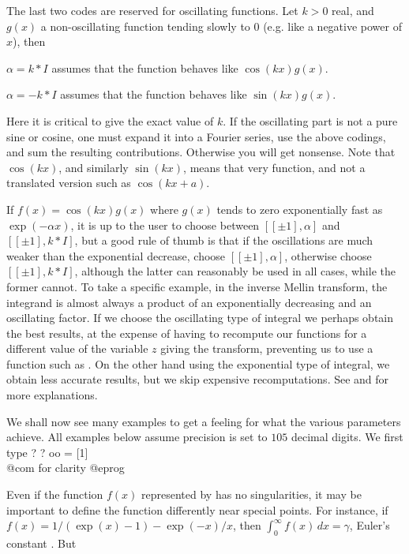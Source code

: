 \smallskip The last two codes are reserved for oscillating functions.
Let $k > 0$ real, and $g(x)$ a non-oscillating function tending slowly to $0$
(e.g. like a negative power of $x$), then

\item $\alpha=k * I$ assumes that the function behaves like $\cos(kx)g(x)$.

\item $\alpha=-k* I$ assumes that the function behaves like $\sin(kx)g(x)$.

\noindent Here it is critical to give the exact value of $k$. If the
oscillating part is not a pure sine or cosine, one must expand it into a
Fourier series, use the above codings, and sum the resulting contributions.
Otherwise you will get nonsense. Note that $\cos(kx)$, and similarly
$\sin(kx)$, means that very function, and not a translated version such as
$\cos(kx+a)$.

 If $f(x)=\cos(kx)g(x)$ where $g(x)$ tends to zero
exponentially fast as $\exp(-\alpha x)$, it is up to the user to choose
between $[[\pm1],\alpha]$ and $[[\pm1],k* I]$, but a good rule of thumb is that
if the oscillations are much weaker than the exponential decrease, choose
$[[\pm1],\alpha]$, otherwise choose $[[\pm1],k* I]$, although the latter can
reasonably be used in all cases, while the former cannot. To take a specific
example, in the inverse Mellin transform, the integrand is almost always a
product of an exponentially decreasing and an oscillating factor. If we
choose the oscillating type of integral we perhaps obtain the best results,
at the expense of having to recompute our functions for a different value of
the variable $z$ giving the transform, preventing us to use a function such
as . On the other hand using the exponential type of
integral, we obtain less accurate results, but we skip expensive
recomputations. See  and  for more
explanations.

\smallskip

We shall now see many examples to get a feeling for what the various
parameters achieve. All examples below assume precision is set to $105$
decimal digits. We first type
\bprog
? 
? oo = [1]  \\@com for clarity
@eprog

 Even if the function $f(x)$ represented
by  has no singularities, it may be important to define the
function differently near special points. For instance, if $f(x) = 1
/(\exp(x)-1) - \exp(-x)/x$, then $\int_0^\infty f(x)\,dx=\gamma$, Euler's
constant . But

